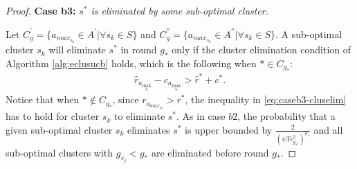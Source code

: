 \begin{proof}
\textbf{Case b3:} \textit{$s^{*}$ is eliminated by some sub-optimal cluster.} 

Let $C_{g}^{'}=\lbrace a_{max_{s_{k}}}\in A^{'}|\forall s_{k}\in S \rbrace$ and $C_{g}^{''}=\lbrace a_{max_{s_{k}}}\in A^{''}|\forall s_{k}\in S \rbrace$. A sub-optimal cluster $s_k$ will eliminate $s^*$ in round $g_*$ only if the cluster elimination condition of Algorithm \ref{alg:eclusucb} holds, which is the following when ${*}\in C_{g_{*}}$:
\begin{align}
\hat r_{a_{\max_{s_k}}} - c_{a_{\max_{s_k}}} > \hat{r}^{*}+ c^{*}.
\label{eq:caseb3-cluselim}
\end{align}
Notice that when ${*}\notin C_{g_{*}}$, since $r_{a_{max_{s_{k}}}}>r^{*}$, the inequality in \eqref{eq:caseb3-cluselim} has to hold for cluster $s_k$ to eliminate $s^*$.
As in case $b2$, the probability that a given sub-optimal cluster $s_k$ eliminates $s^*$ is upper bounded by  $\frac{2}{(\psi T\epsilon_{g_{s^{*}}}^{2})^{\rho_{s}}}$ and all sub-optimal clusters with $g_{s_{j}}< g_{*}$ are eliminated before round $g_*$. 


\end{proof}
